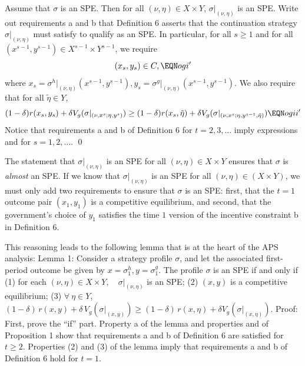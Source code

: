 \medskip\noindent
\medskip{} Assume that $\sigma$ is an SPE.
Then for all $(\nu,\eta) \in X \times Y$, $ \sigma\vert_{(\nu,\eta)}$ is
an SPE.
\medskip
{} Write out requirements a and b that Definition 6 asserts that  the continuation strategy $\sigma\vert_{(\nu,\eta)}$ must satisfy to
qualify as an SPE.  In particular,
for all $s \geq 1$ and for all $(x^{s-1},y^{s-1})
\in X^{s-1} \times Y^{s-1}$, we require
$$ (x_s, y_s) \in C , \EQN ogi' $$
where $x_s = \sigma^h\vert_{(\nu,\eta)}(x^{s-1},y^{s-1}),
y_s = \sigma^g\vert_{(\nu,\eta)}(x^{s-1},y^{s-1})$.
We also require that for all $\tilde \eta \in Y$,
$$ (1-\delta) r(x_s, y_s) + \delta V_g(\sigma\vert
       _{(\nu,  x^s;  \eta, y^s)})
       \geq (1-\delta) r(x_s, \tilde \eta) + \delta
       V_g(\sigma\vert_{(\nu,x^s; \eta,y^{s-1},\tilde \eta)}) \EQN ogii'$$
Notice that requirements a and b of Definition 6 for $t=2, 3, \ldots $
imply expressions  and  for $s = 1,2, \ldots $. \qed

\medskip
  The statement that
$\sigma\vert_{(\nu,\eta)}$ is an SPE for all $(\nu,\eta) \in
X \times Y$ ensures that $\sigma$ is {\it almost\/} an SPE.
If we know that $\sigma\vert_{(\nu,\eta)}$ is an SPE for
all $(\nu, \eta) \in   (X \times Y)$, we must only add  two
requirements to ensure that $\sigma$ is an SPE:
first, that
the $t=1$ outcome pair $(x_1, y_1)$ is a competitive equilibrium,
and second, that the government's choice of $y_1$ satisfies the
time $1$ version of the incentive constraint b in Definition 6.

This reasoning leads  to the following  lemma that is at the heart of the APS analysis:
\medskip\noindent
{\sc Lemma 1:}  Consider a strategy profile $\sigma$, and let
the associated first-period
outcome be given by $x=\sigma^h_1,y=\sigma^g_1$.  The profile $\sigma$ is
an SPE if and only if
\medskip
\noindent (1) for each $(\nu,\eta) \in X\times Y,\quad
\sigma\vert_{(\nu,\eta)}$ is an SPE;
\smallskip
\noindent (2) $(x,y)$ is a competitive equilibrium;
\smallskip
\noindent (3) $\forall\ \eta\in Y$,
$(1-\delta)\, r(x,y) + \delta\,V_g(\sigma\vert_{(x,y)})\geq (1-\delta)\,
r(x,\eta) + \delta V_g(\sigma\vert_{(x,\eta)})$.
\medskip\noindent
{\sc Proof:} First, prove the ``if'' part.  Property a of
the lemma and properties  and 
of Proposition 1 show that requirements a and b of
Definition 6 are satisfied for $t \geq 2$.  Properties (2) and
(3) of the lemma imply that requirements a and b of Definition 6
hold for $t=1$.

